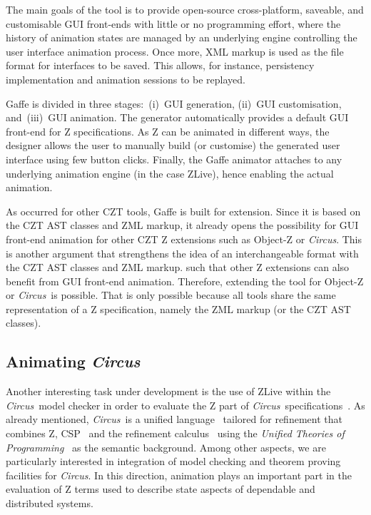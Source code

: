 \documentclass{llncs}
\newcommand{\Circus}{{\sf\slshape Circus}}
\begin{document}
    The main goals of the tool is to provide open-source cross-platform, saveable, and
    customisable GUI front-ends with little or no programming effort, where the
    history of animation states are managed by an underlying engine controlling the
    user interface animation process.
    Once more, XML markup is used as the file format for interfaces to be saved.
    This allows, for instance, persistency implementation and animation sessions
    to be replayed.

    Gaffe is divided in three stages:~(i)~GUI generation, (ii)~GUI customisation,
    and~(iii)~GUI animation. The generator automatically provides a default GUI front-end
    for Z specifications. As Z can be animated in different ways, the designer allows the
    user to manually build (or customise) the generated user interface using few button clicks.
    Finally, the Gaffe animator attaches to any underlying animation engine (in the case ZLive),
    hence enabling the actual animation.

    As occurred for other CZT tools, Gaffe is built for extension.
    Since it is based on the CZT AST classes and ZML markup, it already opens the possibility
    for GUI front-end animation for other CZT Z extensions such as Object-Z or \Circus.
    This is another argument that strengthens the idea of an interchangeable format with
    the CZT AST classes and ZML markup.
     such that other Z extensions
    can also benefit from GUI front-end animation. Therefore, extending the tool for Object-Z
    or \Circus\ is possible. That is only possible because all tools share the same
    representation of a Z specification, namely the ZML markup (or the CZT AST classes).

\subsection{Animating \Circus}

    Another interesting task under development is the use of ZLive within the \Circus\ model checker
    in order to evaluate the Z part of \Circus\ specifications~\cite{circus.mc:leo}.
    As already mentioned, \Circus\ is a unified language~\cite{circus.sem:intro} tailored for refinement
    that combines Z, CSP~\cite{csp.books:roscoe} and the refinement calculus~\cite{fm.ref:morgan}
    using the \textit{Unified Theories of Programming}~\cite{hoare.utp} as the semantic background.
    Among other aspects, we are particularly interested in integration of model checking and
    theorem proving facilities for \Circus. In this direction, animation plays an important part
    in the evaluation of Z terms used to describe state aspects of dependable and distributed systems.
\end{document}
